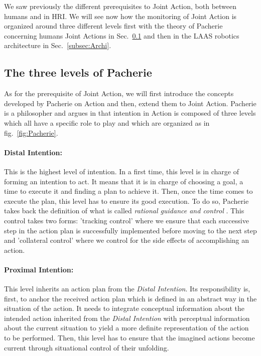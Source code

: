 \documentclass[english,a4paper,11pt,twoside]{StyleThese}
\begin{document}
We saw previously the different prerequisites to Joint Action, both between humans and in HRI. We will see now how the monitoring of Joint Action is organized around three different levels first with the theory of Pacherie concerning humans Joint Actions in Sec.~\ref{subsec:Pacherie} and then in the LAAS robotics architecture in Sec.~\ref{subsec:Archi}.

\subsection{The three levels of Pacherie}

\label{subsec:Pacherie}

As for the prerequisite of Joint Action, we will first introduce the concepts developed by Pacherie on Action and then, extend them to Joint Action. Pacherie is a philosopher and argues in \cite{pacherie2008phenomenology} that intention in Action is composed of three levels which all have a specific role to play and which are organized as in fig.~\ref{fig:Pacherie}. 

\paragraph{Distal Intention:} 
This is the highest level of intention. In a first time, this level is in charge of forming an intention to act. It means that it is in charge of choosing a goal, a time to execute it and finding a plan to achieve it. Then, once the time comes to execute the plan, this level has to ensure its good execution. To do so, Pacherie takes back the definition of what is called \textit{rational guidance and control} \cite{buekens2001indexicaliteit}. This control takes two forms: 'tracking control' where we ensure that each successive step in the action plan is successfully implemented before moving to the next step and 'collateral control' where we control for the side effects of accomplishing an action.

\paragraph{Proximal Intention:}
This level inherits an action plan from the \textit{Distal Intention}. Its responsibility is, first, to anchor the received action plan which is defined in an abstract way in the situation of the action. It needs to integrate conceptual information
about the intended action inherited from the \textit{Distal Intention} with perceptual information about the current situation to yield a more definite representation of the action to be performed. Then, this level has to ensure that the imagined actions become current through situational control of their unfolding.
\end{document}
